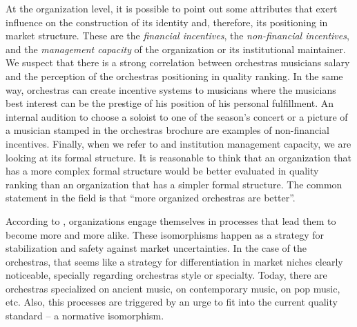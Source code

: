 \documentclass[a4paper, 12pt, openright, oneside, german, french, brazil, english, article]{abntex2}
\begin{document}
	At the organization level, it is possible to point out some attributes that exert influence on the construction of its identity and, therefore, its positioning in market structure. These are the \textit{financial incentives}, the \textit{non-financial incentives}, and  the \textit{management capacity} of the organization or its institutional maintainer. We suspect that there is a strong correlation between orchestras musicians salary and the perception of the orchestras positioning in quality ranking. In the same way, orchestras can create incentive systems to musicians where the musicians best interest can be the prestige of his position of his personal fulfillment. An internal audition to choose a soloist to one of the season's concert or a picture of a musician stamped in the orchestras brochure are examples of non-financial incentives. Finally, when we refer to and institution management capacity, we are looking at its formal structure. It is reasonable to think that an organization that has a more complex formal structure would be better evaluated in quality ranking than an organization that has a simpler formal structure. The common statement in the field is that ``more organized orchestras are better''.
	
	
	According to , organizations engage themselves in processes that lead them to become more and more alike. These isomorphisms happen as a strategy for stabilization and safety against market uncertainties. In the case of the orchestras, that seems like a strategy for differentiation in market niches clearly noticeable, specially regarding orchestras style or specialty. Today, there are orchestras specialized on ancient music, on contemporary music, on pop music, etc. Also, this processes are triggered by an urge to fit into the current quality standard -- a normative isomorphism.
	
	
\end{document}
